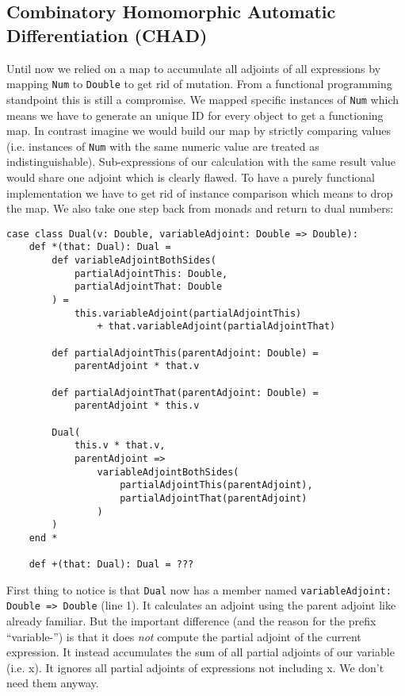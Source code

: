 \subsection{Combinatory Homomorphic Automatic Differentiation (CHAD)} \label{sec:chad}

Until now we relied on a map to accumulate all adjoints of all expressions by mapping \lstinline{Num} to \lstinline{Double} to get rid of mutation. From a functional programming standpoint this is still a compromise. We mapped specific instances of \lstinline{Num} which means we have to generate an unique ID for every object to get a functioning map. In contrast imagine we would build our map by strictly comparing values (i.e. instances of \lstinline{Num} with the same numeric value are treated as indistinguishable). Sub-expressions of our calculation with the same result value would share one adjoint which is clearly flawed. To have a purely functional implementation we have to get rid of instance comparison which means to drop the map. We also take one step back from monads and return to dual numbers:
\begin{lstlisting}
case class Dual(v: Double, variableAdjoint: Double => Double):
    def *(that: Dual): Dual =
        def variableAdjointBothSides(
            partialAdjointThis: Double, 
            partialAdjointThat: Double
        ) =
            this.variableAdjoint(partialAdjointThis) 
                + that.variableAdjoint(partialAdjointThat)

        def partialAdjointThis(parentAdjoint: Double) = 
            parentAdjoint * that.v
            
        def partialAdjointThat(parentAdjoint: Double) = 
            parentAdjoint * this.v

        Dual(
            this.v * that.v,
            parentAdjoint =>
                variableAdjointBothSides(
                    partialAdjointThis(parentAdjoint), 
                    partialAdjointThat(parentAdjoint)
                )
        )
    end *

    def +(that: Dual): Dual = ???
\end{lstlisting}
First thing to notice is that \lstinline{Dual} now has a member named \lstinline{variableAdjoint: Double => Double} (line 1). It calculates an adjoint using the parent adjoint like already familiar. But the important difference (and the reason for the prefix ``variable-'') is that it does \emph{not} compute the partial adjoint of the current expression. It instead accumulates the sum of all partial adjoints of our variable (i.e. x). It ignores all partial adjoints of expressions not including x. We don't need them anyway.

